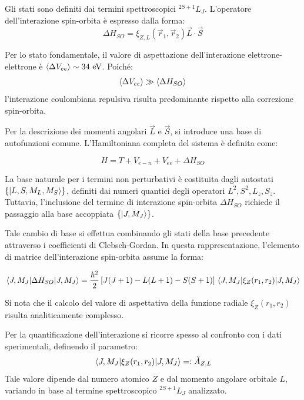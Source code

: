 Gli stati sono definiti dai termini spettroscopici \(^{2S+1}L_J\). L'operatore dell'interazione spin-orbita è espresso dalla forma:
\begin{equation}
    \Delta H_{SO} = \xi_{Z, L}(\vec{r}_1, \vec{r}_2) \vec{L} \cdot \vec{S}
\end{equation}

Per lo stato fondamentale, il valore di aspettazione dell'interazione elettrone-elettrone è \(\expval{\Delta V_{ee}} \sim 34 \text{ eV}\). Poiché:
\begin{equation}
    \expval{\Delta V_{ee}} \gg \expval{\Delta H_{SO}}
\end{equation}
l'interazione coulombiana repulsiva risulta predominante rispetto alla correzione spin-orbita.

Per la descrizione dei momenti angolari \(\vec{L}\) e \(\vec{S}\), si introduce una base di autofunzioni comune. L'Hamiltoniana completa del sistema è definita come:

\begin{equation}
    H = T + V_{e-n} + V_{ee} + \Delta H_{SO}
\end{equation}

La base naturale per i termini non perturbativi è costituita dagli autostati \(\{ \ket{L, S, M_L, M_S } \}\), definiti dai numeri quantici degli operatori \(L^2, S^2, L_z, S_z\). Tuttavia, l'inclusione del termine di interazione spin-orbita \(\Delta H_{SO}\) richiede il passaggio alla base accoppiata \(\{ \ket{J, M_J} \}\). 

Tale cambio di base si effettua combinando gli stati della base precedente attraverso i coefficienti di Clebsch-Gordan. In questa rappresentazione, l'elemento di matrice dell'interazione spin-orbita assume la forma:

\begin{equation}
    \mel{J, M_J}{\Delta H_{SO}}{J, M_J} = \frac{\hbar^2}{2} \left[ J(J+1) - L(L+1) - S(S+1) \right] \mel{J, M_J}{\xi_Z(r_1, r_2)}{J, M_J}
\end{equation}

Si nota che il calcolo del valore di aspettativa della funzione radiale \(\xi_Z(r_1, r_2)\) risulta analiticamente complesso.

Per la quantificazione dell'interazione si ricorre spesso al confronto con i dati sperimentali, definendo il parametro:
\begin{equation}
    \mel{J, M_J}{\xi_Z(r_1, r_2)}{J, M_J} =: \tilde{A}_{Z, L}
\end{equation}
Tale valore dipende dal numero atomico \(Z\) e dal momento angolare orbitale \(L\), variando in base al termine spettroscopico \(^{2S+1}L_J\) analizzato.

